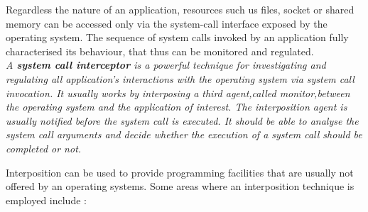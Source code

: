 

Regardless the nature of an application, resources such us files, socket or shared memory can be accessed only via the system-call interface exposed by the operating system.
The sequence of system calls invoked by an application fully characterised its behaviour, that thus can be monitored and regulated. \\


\textit{A \textbf{system call interceptor} is a powerful technique for investigating and regulating all application's interactions with the operating system via system call invocation. It usually works by interposing a third agent,called monitor,between the operating system and the application of interest. The interposition agent is usually notified before the system call is executed. It should be able to analyse the system call arguments and decide whether the execution of a system call should be completed or not.\\
}


Interposition can be used to provide programming facilities that are usually not offered by an operating systems. Some areas where an interposition technique is employed include :

